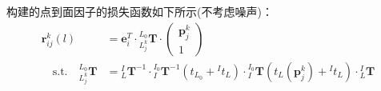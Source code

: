 \section{}
\label{sect:point_to_plnae_factor_jacobian}
构建的点到面因子的损失函数如下所示(不考虑噪声)：
\begin{equation}
  \begin{aligned}
    \boldsymbol{r}_{ij}^k(l)       & =\boldsymbol{e}_i^T\cdot{^{L_0}_{L_j^k}\boldsymbol{T}}\cdot\begin{pmatrix}
                                                                                                  \boldsymbol{p}_j^k \\1
                                                                                                \end{pmatrix}                                                                                                                                         \\
    \quad\mathrm{s.t.}\quad
    {^{L_0}_{L_j^k}\boldsymbol{T}} & ={{^{I}_{L}}\boldsymbol{T}^{-1}}\cdot{{^{I_0}_{I}}\boldsymbol{T}^{-1}\left( t_{L_0}+{^{I}t_L}\right) }\cdot{{^{I_0}_{I}}\boldsymbol{T}\left( t_{L}(\boldsymbol{p}_j^k)+{^{I}t_L}\right) }\cdot{{^{I}_{L}}\boldsymbol{T}}
  \end{aligned}
\end{equation}
